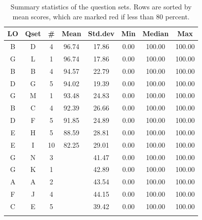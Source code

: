 \documentclass[12pt,english,nohyper]{tufte-handout}\usepackage[]{graphicx}\usepackage[]{color}
\begin{document}
\begin{fullwidth}
\makeatletter\setlength\hsize{\@tufte@fullwidth}\makeatother
\begin{longtable}{cc|ccc|ccc}
  \hline
LO & Qset & \# & Mean & Std.dev & Min & Median & Max \\ 
  \hline
B & D &   4 & 96.74 & 17.86 & 0.00 & 100.00 & 100.00 \\ 
  G & L &   1 & 96.74 & 17.86 & 0.00 & 100.00 & 100.00 \\ 
  B & B &   4 & 94.57 & 22.79 & 0.00 & 100.00 & 100.00 \\ 
  D & G &   5 & 94.02 & 19.39 & 0.00 & 100.00 & 100.00 \\ 
  G & M &   1 & 93.48 & 24.83 & 0.00 & 100.00 & 100.00 \\ 
  B & C &   4 & 92.39 & 26.66 & 0.00 & 100.00 & 100.00 \\ 
  D & F &   5 & 91.85 & 24.89 & 0.00 & 100.00 & 100.00 \\ 
  E & H &   5 & 88.59 & 28.81 & 0.00 & 100.00 & 100.00 \\ 
  E & I &  10 & 82.25 & 29.01 & 0.00 & 100.00 & 100.00 \\ 
  G & N &   3 & \color{red}{78.26} & 41.47 & 0.00 & 100.00 & 100.00 \\ 
  G & K &   1 & \color{red}{76.09} & 42.89 & 0.00 & 100.00 & 100.00 \\ 
  A & A &   2 & \color{red}{75} & 43.54 & 0.00 & 100.00 & 100.00 \\ 
  F & J &   4 & \color{red}{73.91} & 44.15 & 0.00 & 100.00 & 100.00 \\ 
  C & E &   5 & \color{red}{66.85} & 39.42 & 0.00 & 100.00 & 100.00 \\ 
   \hline
\hline
\caption{Summary statistics of the question sets. Rows are sorted by mean scores, which are marked red if less than 80 percent.} 
\label{tab:QuestionSet_summary}
\end{longtable}

\end{fullwidth}
\end{document}
